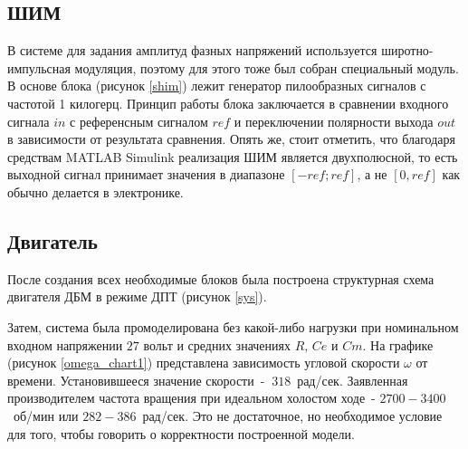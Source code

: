 \clearpage

\subsection{ШИМ}

В системе для задания амплитуд фазных напряжений используется широтно-импульсная модуляция, 
поэтому для этого тоже был собран специальный модуль.
В основе блока (рисунок \ref{shim}) лежит генератор пилообразных сигналов с частотой 1 килогерц. 
Принцип работы блока заключается в сравнении входного сигнала $in$ с референсным сигналом
$ref$ и переключении полярности выхода $out$ в зависимости от результата сравнения. Опять же, стоит отметить, что
благодаря средствам MATLAB Simulink реализация ШИМ является двухполюсной, то есть выходной сигнал принимает
значения в диапазоне $[-ref; ref]$, а не $[0, ref]$ как обычно делается в электронике.

\subsection{Двигатель}

После создания всех необходимые блоков была построена структурная схема двигателя ДБМ в режиме ДПТ (рисунок \ref{sys}).


Затем, система была промоделирована без какой-либо нагрузки при номинальном входном 
напряжении $27$ вольт и средних значениях $R$, $Ce$ и $Cm$. На графике (рисунок \ref{omega_chart1}) 
представлена зависимость угловой скорости $\omega$ от времени. Установившееся значение скорости~- $~318$~рад/сек. Заявленная
производителем частота вращения при идеальном холостом ходе~- $2700-3400$~об/мин или $282-386$~рад/сек. Это 
не достаточное, но необходимое условие для того, чтобы говорить о корректности построенной модели.

